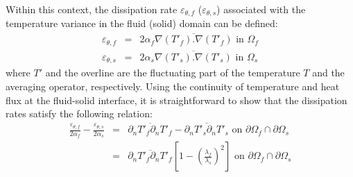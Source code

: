 \documentclass[review]{elsarticle}
\begin{document}
Within this context, the dissipation rate $\varepsilon_{\theta,f}$ ($\varepsilon_{\theta,s}$) associated with the temperature variance in the fluid (solid) domain can be defined:
\begin{eqnarray}
\varepsilon_{\theta,f} & = & 2 \alpha_f \overline{ \nabla \left( T'_f \right) . \nabla \left( T'_f \right) } \mbox{ in } \Omega_f \nonumber \\
\varepsilon_{\theta,s} & = & 2 \alpha_s \overline{ \nabla \left( T'_s \right) . \nabla \left( T'_s \right) } \mbox{ in } \Omega_s
\label{eq_def_diff_flu_sol}
\end{eqnarray}
where $T'$ and the overline are the fluctuating part of the temperature $T$ and the averaging operator, respectively. Using the continuity of temperature and heat flux at the fluid-solid interface, it is straightforward to show that the dissipation rates satisfy the following relation:
\begin{eqnarray} \label{eq_discontinuity_dim}
\frac{\varepsilon_{\theta,f}}{2 \alpha_f} - \frac{\varepsilon_{\theta,s}}{2 \alpha_s} & = & \overline{ \partial_n T'_f \partial_n T'_f } - \overline{ \partial_n T'_s \partial_n T'_s } \mbox{ on } \partial \Omega_f \cap \partial \Omega_s \nonumber \\
& = & \overline{ \partial_n T'_f \partial_n T'_f } \left[ 1 - \left( \frac{\lambda_f}{\lambda_s} \right)^2 \right] \mbox{ on } \partial \Omega_f \cap \partial \Omega_s
\end{eqnarray}
\end{document}
